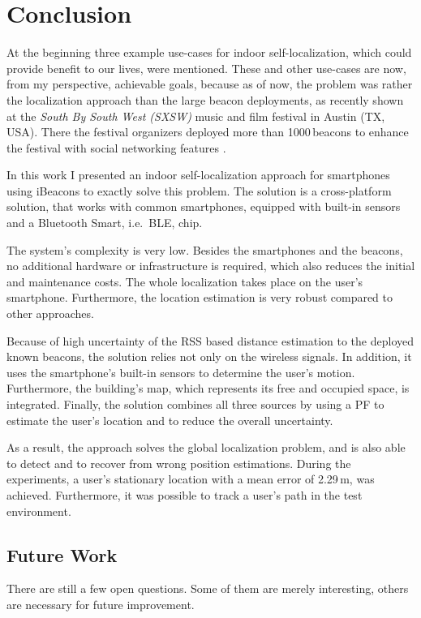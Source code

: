 \chapter{Conclusion} \label{chap:conclusion}
At the beginning three example use-cases for indoor self-localization, which could provide benefit to our lives, were mentioned. These and other use-cases are now, from my perspective, achievable goals, because as of now, the problem was rather the localization approach than the large beacon deployments, as recently shown at the \emph{South By South West (SXSW)} music and film festival in Austin (TX, USA). There the festival organizers deployed more than 1000\,beacons to enhance the festival with social networking features \citep{mashable}.

In this work I presented an indoor self-localization approach for smartphones using iBeacons to exactly solve this problem. The solution is a cross-platform solution, that works with common smartphones, equipped with built-in sensors and a Bluetooth Smart, i.e.\ \acl{BLE}, chip.

The system's complexity is very low. Besides the smartphones and the beacons, no additional hardware or infrastructure is required, which also reduces the initial and maintenance costs. The whole localization takes place on the user's smartphone. Furthermore, the location estimation is very robust compared to other approaches.

Because of high uncertainty of the \acs{RSS} based distance estimation to the deployed known beacons, the solution relies not only on the wireless signals. In addition, it uses the smartphone's built-in sensors to determine the user's motion. Furthermore, the building's map, which represents its free and occupied space, is integrated. Finally, the solution combines all three sources by using a \acl{PF} to estimate the user's location and to reduce the overall uncertainty.

As a result, the approach solves the global localization problem, and is also able to detect and to recover from wrong position estimations. During the experiments, a user's stationary location with a mean error of 2.29\,m, was achieved. Furthermore, it was possible to track a user's path in the test environment.


\section{Future Work} \label{sec:future}
There are still a few open questions. Some of them are merely interesting, others are necessary for future improvement.

